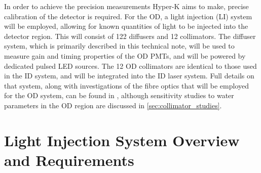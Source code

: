 \documentclass[a4paper,11pt]{article}
\begin{document}
In order to achieve the precision measurements Hyper-K aims to make, precise calibration of the detector is required. For the OD, a light injection (LI) system will be employed, allowing for known quantities of light to be injected into the detector region. This will consist of 122 diffusers and 12 collimators. The diffuser system, which is primarily described in this technical note, will be used to measure gain and timing properties of the OD PMTs, and will be powered by dedicated pulsed LED sources. The 12 OD collimators are identical to those used in the ID system, and will be integrated into the ID laser system. Full details on that system, along with investigations of the fibre optics that will be employed for the OD system, can be found in \cite{TN91}, although sensitivity studies to water parameters in the OD region are discussed in \cref{sec:collimator_studies}.

\section{Light Injection System Overview and Requirements}\label{sec:overview}
\end{document}
